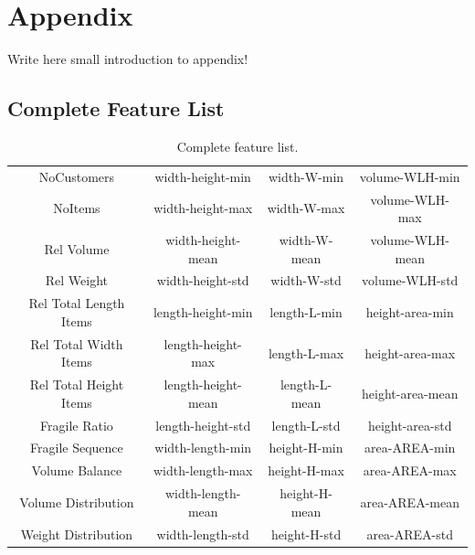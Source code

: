 \appendix
\chapter{Appendix}

Write here small introduction to appendix! %
\clearpage
\section{Complete Feature List}
\begin{table}[ht]
    \centering
    \small
    \renewcommand{\arraystretch}{1.3}
    \begin{tabular}{@{}cccc@{}}
        NoCustomers            & width-height-min   & width-W-min   & volume-WLH-min   \\
        NoItems                & width-height-max   & width-W-max   & volume-WLH-max   \\
        Rel Volume             & width-height-mean  & width-W-mean  & volume-WLH-mean  \\
        Rel Weight             & width-height-std   & width-W-std   & volume-WLH-std   \\
        Rel Total Length Items & length-height-min  & length-L-min  & height-area-min  \\
        Rel Total Width Items  & length-height-max  & length-L-max  & height-area-max  \\
        Rel Total Height Items & length-height-mean & length-L-mean & height-area-mean \\
        Fragile Ratio          & length-height-std  & length-L-std  & height-area-std  \\
        Fragile Sequence       & width-length-min   & height-H-min  & area-AREA-min    \\
        Volume Balance         & width-length-max   & height-H-max  & area-AREA-max    \\
        Volume Distribution    & width-length-mean  & height-H-mean & area-AREA-mean   \\
        Weight Distribution    & width-length-std   & height-H-std  & area-AREA-std    \\
    \end{tabular}
    \caption{Complete feature list.}
    \label{tab:complete_features_list}
\end{table}

